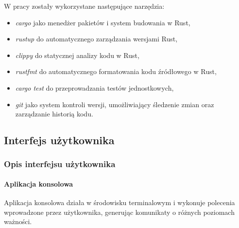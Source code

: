             W pracy zostały wykorzystane następujące narzędzia:
            \begin{itemize}
                \item \textit{cargo} jako menedżer pakietów i system budowania w Rust,
                \item \textit{rustup} do automatycznego zarządzania wersjami Rust,
                \item \textit{clippy} do statycznej analizy kodu w Rust,
                \item \textit{rustfmt} do automatycznego formatowania kodu źródłowego w Rust,
                \item \textit{cargo test} do przeprowadzania testów jednostkowych,
                \item \textit{git} jako system kontroli wersji, umożliwiający śledzenie zmian oraz zarządzanie historią kodu.
            \end{itemize}

    \subsection{Interfejs użytkownika}

        \subsubsection{Opis interfejsu użytkownika}

            \paragraph{Aplikacja konsolowa}
                
                Aplikacja konsolowa działa w środowisku terminalowym i wykonuje polecenia wprowadzone przez użytkownika, generując komunikaty o różnych poziomach ważności.
                
